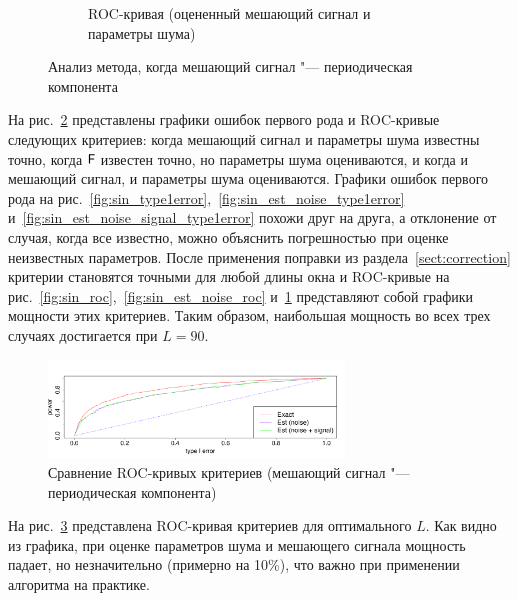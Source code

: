 \documentclass[specialist,
substylefile = spbu_report.rtx,
subf,href,colorlinks=true, 12pt]{disser}
\theoremstyle{definition}
\begin{document}
\begin{figure}[h!]
\begin{subfigure}[t]{0.5\textwidth}
		\caption{ROC-кривая (оцененный мешающий сигнал и параметры шума)}
		\label{fig:sin_est_noise_signal_roc}
	\end{subfigure}
	
	
	\caption{Анализ метода, когда мешающий сигнал "--- периодическая компонента}
	\label{fig:sin}
\end{figure}

На рис.~\ref{fig:sin} представлены графики ошибок первого рода и ROC-кривые следующих критериев: когда мешающий сигнал и параметры шума известны точно, когда $\mathsf{F}$ известен точно, но параметры шума оцениваются, и когда и мешающий сигнал, и параметры шума оцениваются. Графики ошибок первого рода на рис.~\ref{fig:sin_type1error},~\ref{fig:sin_est_noise_type1error} и~\ref{fig:sin_est_noise_signal_type1error} похожи друг на друга, а отклонение от случая, когда все известно, можно объяснить погрешностью при оценке неизвестных параметров. После применения поправки из раздела~\ref{sect:correction} критерии становятся точными для любой длины окна и ROC-кривые на рис.~\ref{fig:sin_roc},~\ref{fig:sin_est_noise_roc} и~\ref{fig:sin_est_noise_signal_roc} представляют собой графики мощности этих критериев. Таким образом, наибольшая мощность во всех трех случаях достигается при $L=90$.
\begin{figure}[h!]
	\centering
	\includegraphics[width=0.7\textwidth]{img/roc_sin_copm.pdf}
	\caption{Сравнение ROC-кривых критериев (мешающий сигнал "--- периодическая компонента)}
	\label{fig:power_comp_sin}
\end{figure}

На рис.~\ref{fig:power_comp_sin} представлена ROC-кривая критериев для оптимального $L$. Как видно из графика, при оценке параметров шума и мешающего сигнала мощность падает, но незначительно (примерно на 10\%), что важно при применении алгоритма на практике.
\end{document}

